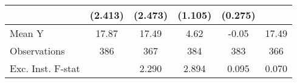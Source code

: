 {\begin{tabular}{l*{5}{c}}
            &     (2.413)         &     (2.473)         &     (1.105)         &     (0.275)         &                     \\
\midrule
Mean Y      &       17.87         &       17.49         &        4.62         &       -0.05         &       17.49         \\
Observations&         386         &         367         &         384         &         383         &         366         \\
Exc. Inst. F-stat&                     &       2.290         &       2.894         &       0.095         &       0.070         \\
\bottomrule
\end{tabular}
}
